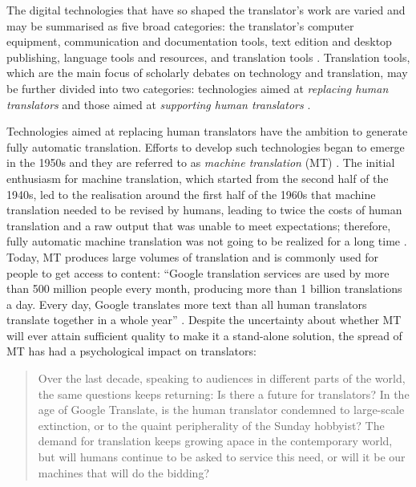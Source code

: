 The digital technologies that have so shaped the translator’s work are varied and may be summarised as five broad categories: the translator’s computer equipment, communication and documentation tools, text edition and desktop publishing, language tools and resources, and translation tools \citep{alcina2008translation}. Translation tools, which are the main focus of scholarly debates on technology and translation, may be further divided into two categories: technologies aimed at \textit{replacing human translators} and those aimed at \textit{supporting human translators} \citep{alcina2008translation}.

Technologies aimed at replacing human translators have the ambition to generate fully automatic translation. Efforts to develop such technologies began to emerge in the 1950s and they are referred to as \textit{machine translation} (MT) \citep{hutchins2015machine}. The initial enthusiasm for machine translation, which started from the second half of the 1940s, led to the realisation around the first half of the 1960s that machine translation needed to be revised by humans, leading to twice the costs of human translation and a raw output that was unable to meet expectations; therefore, fully automatic machine translation was not going to be realized for a long time \citep[3--4]{chan2015}. Today, MT produces large volumes of translation and is commonly used for people to get access to content: ``Google translation services are used by more than 500 million people every month, producing more than 1 billion translations a day. Every day, Google translates more text than all human translators translate together in a whole year'' \citep[377]{carl2017translation}. Despite the uncertainty about whether MT will ever attain sufficient quality to make it a stand-alone solution, the spread of MT has had a psychological impact on translators:
\begin{quote}
    Over the last decade, speaking to audiences in different parts of the world, the same questions keeps returning: Is there a future for translators? In the age of Google Translate, is the human translator condemned to large-scale extinction, or to the quaint peripherality of the Sunday hobbyist? The demand for translation keeps growing apace in the contemporary world, but will humans continue to be asked to service this need, or will it be our machines that will do the bidding? \citep[1]{cronin2012translation}
\end{quote}
